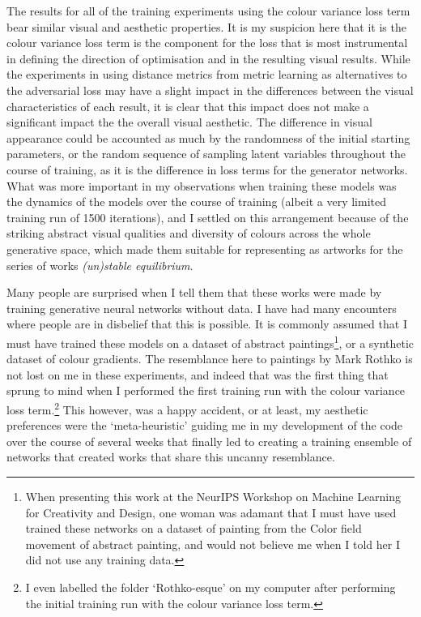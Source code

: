 The results for all of the training experiments using the colour variance loss term bear similar visual and aesthetic properties. 
It is my suspicion here that it is the colour variance loss term is the component for the loss that is most instrumental in defining the direction of optimisation and in the resulting visual results.
While the experiments in using distance metrics from metric learning as alternatives to the adversarial loss may have a slight impact in the differences between the visual characteristics of each result, it is clear that this impact does not make a significant impact the the overall visual aesthetic.
The difference in visual appearance could be accounted as much by the randomness of the initial starting parameters, or the random sequence of sampling latent variables throughout the course of training, as it is the difference in loss terms for the generator networks.
What was more important in my observations when training these models was the dynamics of the models over the course of training (albeit a very limited training run of 1500 iterations), and I settled on this arrangement because of the striking abstract visual qualities and diversity of colours across the whole generative space, which made them suitable for representing as artworks for the series of works \textit{(un)stable equilibrium}. 

Many people are surprised when I tell them that these works were made by training generative neural networks without data.
I have had many encounters where people are in disbelief that this is possible. It is commonly assumed that I must have trained these models on a dataset of abstract paintings\footnote{When presenting this work at the NeurIPS Workshop on Machine Learning for Creativity and Design, one woman was adamant that I must have used trained these networks on a dataset of painting from the Color field movement of abstract painting, and would not believe me when I told her I did not use any training data.}, or a synthetic dataset of colour gradients. 
The resemblance here to paintings by Mark Rothko is not lost on me in these experiments, and indeed that was the first thing that sprung to mind when I performed the first training run with the colour variance loss term.\footnote{I even labelled the folder `Rothko-esque' on my computer after performing the initial training run with the colour variance loss term.} 
This however, was a happy accident, or at least, my aesthetic preferences were the `meta-heuristic' guiding me in my development of the code over the course of several weeks that finally led to creating a training ensemble of networks that created works that share this uncanny resemblance.

